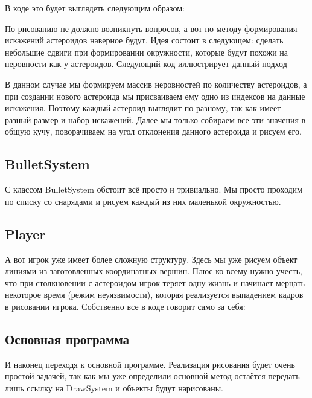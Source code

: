 В коде это будет выглядеть следующим образом:


По рисованию не должно возникнуть вопросов, а вот по методу формирования искажений астероидов наверное 
будут. Идея состоит в следующем: сделать небольшие сдвиги при формировании окружности, которые будут похожи 
на неровности как у астероидов. Следующий код иллюстрирует данный подход


В данном случае мы формируем массив неровностей по количеству астероидов, а при создании нового астероида мы 
присваиваем ему одно из индексов на данные искажения. Поэтому каждый астероид выглядит по разному, так как 
имеет разный размер и набор искажений. Далее мы только собираем все эти значения в общую кучу, поворачиваем 
на угол отклонения данного астероида и рисуем его.

\pagebreak

\subsection{BulletSystem}
С классом BulletSystem обстоит всё просто и тривиально. Мы просто проходим по списку со снарядами и рисуем 
каждый из них маленькой окружностью.


\subsection{Player}
А вот игрок уже имеет более сложную структуру. Здесь мы уже рисуем объект линиями из заготовленных 
координатных вершин. Плюс ко всему нужно учесть, что при столкновении с астероидом игрок теряет одну жизнь и 
начинает мерцать некоторое время (режим неуязвимости), которая реализуется выпадением кадров в рисовании 
игрока. Собственно все в коде говорит само за себя:


\subsection{Основная программа}
И наконец переходя к основной программе. Реализация рисования будет очень простой задачей, так как мы уже 
определили основной метод остаётся передать лишь ссылку на DrawSystem и объекты будут нарисованы.


